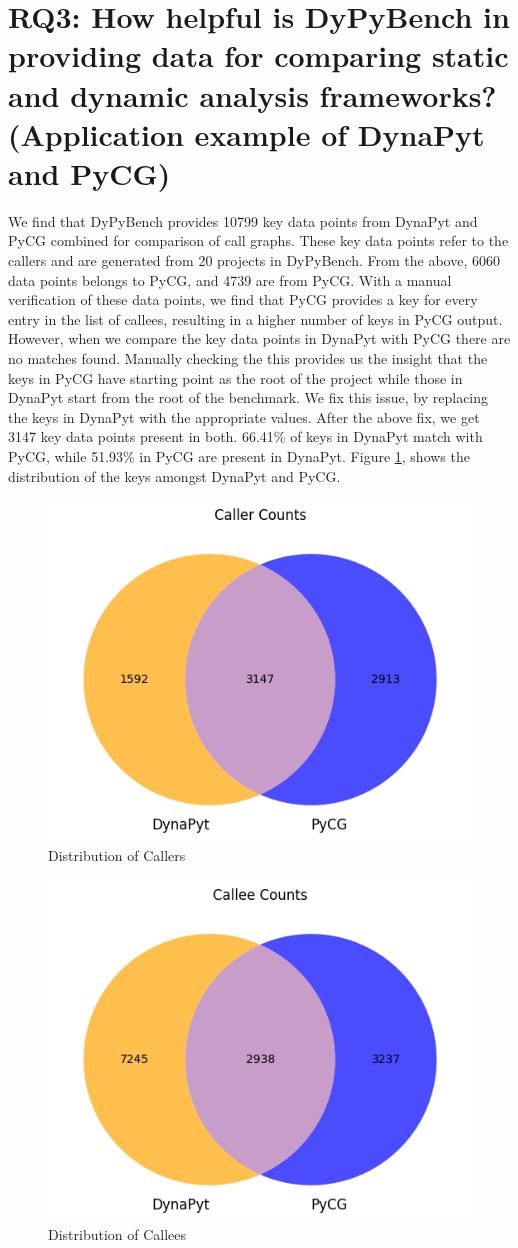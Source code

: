 \section{RQ3: How helpful is DyPyBench in providing data for comparing static and dynamic analysis frameworks? (Application example of DynaPyt and PyCG)}

We find that DyPyBench provides 10799 key data points from DynaPyt and PyCG combined for comparison of call graphs.
These key data points refer to the callers and are generated from 20 projects in DyPyBench.
From the above, 6060 data points belongs to PyCG, and 4739 are from PyCG.
With a manual verification of these data points, we find that PyCG provides a key for every entry in the list of callees, resulting in a higher number of keys in PyCG output.
However, when we compare the key data points in DynaPyt with PyCG there are no matches found.
Manually checking the this provides us the insight that the keys in PyCG have starting point as the root of the project while those in DynaPyt start from the root of the benchmark.
We fix this issue, by replacing the keys in DynaPyt with the appropriate values.
After the above fix, we get 3147 key data points present in both.
66.41\% of keys in DynaPyt match with PyCG, while 51.93\% in PyCG are present in DynaPyt.
Figure \ref{fig:caller counts}, shows the distribution of the keys amongst DynaPyt and PyCG.
\begin{figure}[ht]
    \centering
    \includegraphics[width=0.5\linewidth]{figures/evaluation/callercounts.png}
    \caption[Distribution of Callers]{\label{fig:caller counts}Distribution of Callers }
\end{figure}
\begin{figure}[ht]
    \centering
    \includegraphics[width=0.5\linewidth]{figures/evaluation/calleecounts.png}
    \caption[Distribution of Callees]{\label{fig:callee_counts}Distribution of Callees}
\end{figure}

